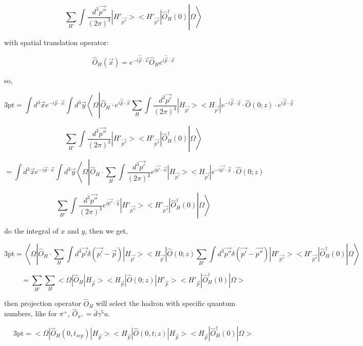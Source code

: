 \documentclass[11pt]{article} %
\begin{document}
\[ \left. \left. \sum_{H'} \int \frac{d^3 \vec{p''}}{(2\pi)^3} |H'_{\vec{p''}}><H'_{\vec{p''}}| \hat{O}_{H}^{\dagger}(0)  \right| \Omega\right\rangle \]

with spatial translation operator:

\[ \hat{O}_{H}(\vec{x}) = e^{-i \hat{\vec{p}} \cdot \vec{x}} \hat{O}_{H} e^{i \hat{\vec{p}} \cdot \vec{x}} \]

so,

\[ \text{3pt} = \int d^{3} \vec{x} e^{-i \vec{p} \cdot \vec{x}} \int d^3 \vec{y}\left\langle\Omega\left|\hat{O}_{H} \cdot e^{i \hat{\vec{p}} \cdot \vec{x}} \sum_{H} \int \frac{d^3 \vec{p'}}{(2\pi)^3}  |H_{\vec{p'}}><H_{\vec{p'}}| e^{-i \hat{\vec{p}} \cdot \vec{y}} \cdot \hat{O}(0; z) \cdot e^{i \hat{\vec{p}} \cdot \vec{y}} \right. \right. \]
    
\[ \left. \left. \sum_{H'} \int \frac{d^3 \vec{p''}}{(2\pi)^3} |H'_{\vec{p''}}><H'_{\vec{p''}}| \hat{O}_{H}^{\dagger}(0)  \right| \Omega\right\rangle \]

\[= \int d^{3} \vec{x} e^{-i \vec{p} \cdot \vec{x}} \int d^3 \vec{y}\left\langle\Omega\left|\hat{O}_{H} \cdot \sum_{H} \int \frac{d^3 \vec{p'}}{(2\pi)^3} e^{i \vec{p'} \cdot \vec{x}} |H_{\vec{p'}}><H_{\vec{p'}}| e^{-i \vec{p'} \cdot \vec{y}} \cdot \hat{O}(0; z) \right. \right.\]

\[ \left. \left. \sum_{H'} \int \frac{d^3 \vec{p''}}{(2\pi)^3} e^{i \vec{p''} \cdot \vec{y}} |H'_{\vec{p''}}><H'_{\vec{p''}}| \hat{O}_{H}^{\dagger}(0)  \right| \Omega\right\rangle \]

do the integral of $x$ and $y$, then we get,

\[ \text{3pt} = \left\langle\Omega\left|\hat{O}_{H} \cdot \sum_{H} \int d^3 \vec{p'} \delta(\vec{p'} - \vec{p} ) |H_{\vec{p'}}><H_{\vec{p'}}| \hat{O}(0; z)  \sum_{H'} \int d^3 \vec{p''}  \delta(\vec{p'} - \vec{p''}) |H'_{\vec{p''}}><H'_{\vec{p''}}| \hat{O}_{H}^{\dagger}(0)  \right| \Omega\right\rangle \]

\[ = \sum_{H'} \sum_{H} <\Omega |\hat{O}_{H}  |H_{\vec{p}}><H_{\vec{p}}| \hat{O}(0; z) |H'_{\vec{p}}><H'_{\vec{p}}| \hat{O}_{H}^{\dagger}(0) | \Omega> \]


then projection operator $\hat{O}_{H}$ will select the hadron with specific quantum numbers, like for $\pi^+$, $\hat{O}_{\pi^+} = \bar{d} \gamma^5 u$.

\[ \text{3pt} = <\Omega |\hat{O}_{H} (0, t_{sep})  |H_{\vec{p}}><H_{\vec{p}}| \hat{O}(0, t; z) |H_{\vec{p}}><H_{\vec{p}}| \hat{O}_{H}^{\dagger}(0) | \Omega> \]
\end{document}
